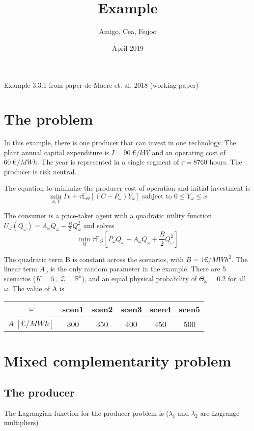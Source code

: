 \documentclass[12pt, letterpaper]{article}
\title{Example}
\author{Amigo, Cea, Feijoo}
\date{April 2019}
\begin{document}
\maketitle

Example 3.3.1 from paper de Maere et. al. 2018 (working paper)

\section{The problem}
In this example, there is one producer that can invest in one technology. 
The plant annual capital expenditure is $I= 90 \ \euro{} / kW$ and an operating cost of $60 \ \euro{} / MWh$.
The year is represented in a single segment of $\tau=8760$ hours. The producer is risk neutral.

The equation to minimize the producer cost of operation and initial investment is 
\[ \min_{x,Y}  Ix + \tau \mathbb{E}_{\Theta} [(C-P_{\omega}) Y_{\omega}]  \textrm{\  subject to \ }  0 \leq Y_{\omega} \leq x \]

The consumer is a price-taker agent with  a quadratic utility function $U_\omega(Q_\omega) = A_\omega Q_\omega - \frac{B}{2} Q_\omega^2$ and solves
\[ \min_{Q} \tau \mathbb{E}_\Theta \left[P_\omega Q_\omega - A_\omega Q_\omega + \frac{B}{2} Q_\omega^2 \right]\]

The quadratic term B is constant across the scenarios, with $B=1 \euro{}/MWh^2$.
The linear term $A_\omega$ is the only random parameter in the example. There are 5 scenarios ($K=5 \ , \ \mathcal{Z}=\mathbb{R}^5$), and an equal physical probability of $\Theta_\omega = 0.2$ for all $\omega$. The value of A is 

\begin{center}
\begin{tabular}{ c | c c c c c }
 $\omega$             & scen1 & scen2 & scen3 & scen4 & scen5 \\ 
 \hline
  $A \ [ \euro{}/MWh ] $ & 300   & 350   & 400   & 450   & 500 \\  
\end{tabular}
\end{center}



\section{Mixed complementarity problem}

\subsection{The producer}
The Lagrangian function for the producer problem is ($\lambda_1$ and $\lambda_2$ are Lagrange multipliers)
\end{document}
